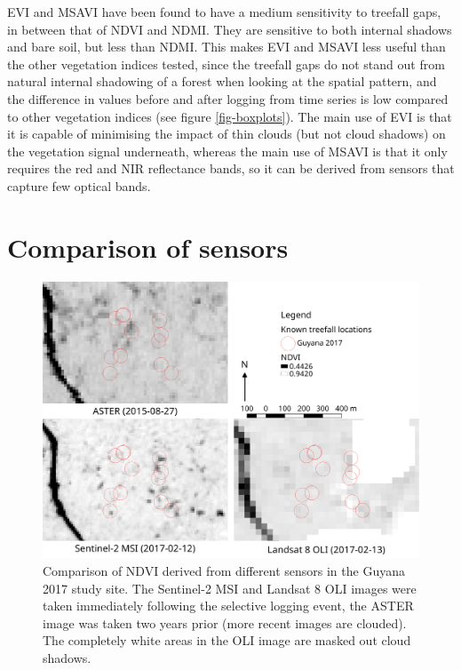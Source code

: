 \documentclass[a4paper,12pt]{scrbook}
\begin{document}
\ac{EVI} and \ac{MSAVI} have been found to have a medium sensitivity to treefall gaps, in between that of \ac{NDVI} and \ac{NDMI}. They are sensitive to both internal shadows and bare soil, but less than \ac{NDMI}. This makes \ac{EVI} and \ac{MSAVI} less useful than the other vegetation indices tested, since the treefall gaps do not stand out from natural internal shadowing of a forest when looking at the spatial pattern, and the difference in values before and after logging from time series is low compared to other vegetation indices (see figure \ref{fig-boxplots}). The main use of \ac{EVI} is that it is capable of minimising the impact of thin clouds (but not cloud shadows) on the vegetation signal underneath, whereas the main use of \ac{MSAVI} is that it only requires the red and \ac{NIR} reflectance bands, so it can be derived from sensors that capture few optical bands.

\section{Comparison of sensors}

\begin{figure}
  \centering
  \includegraphics[width=\textwidth]{thesis-figures/22-guyana17-sensor-resolution}
  \caption{Comparison of \ac{NDVI} derived from different sensors in the Guyana 2017 study site. The Sentinel-2 \ac{MSI} and Landsat 8 \ac{OLI} images were taken immediately following the selective logging event, the \ac{ASTER} image was taken two years prior (more recent images are clouded). The completely white areas in the \ac{OLI} image are masked out cloud shadows.}
  \label{fig-sensor-resolution}
\end{figure}
\end{document}
